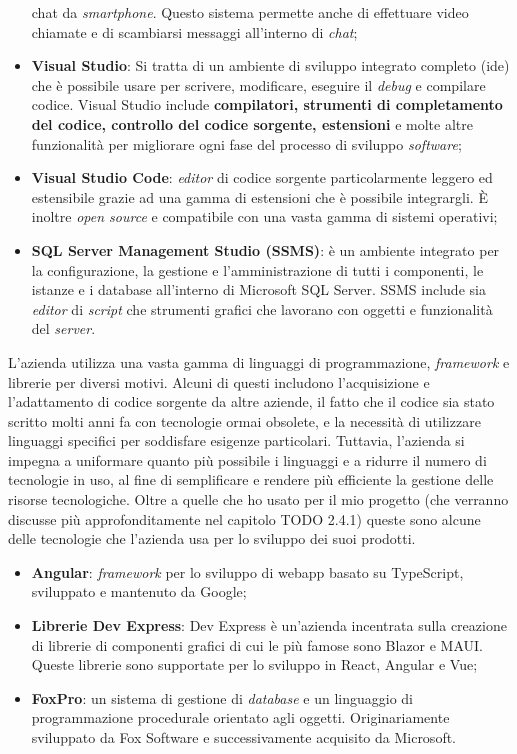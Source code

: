 \begin{itemize}
          chat da \textit{smartphone}. Questo sistema permette anche di effettuare video chiamate e di scambiarsi messaggi all'interno di \textit{chat};
    \item \textbf{Visual Studio}: Si tratta di un ambiente di sviluppo integrato completo (\gls{ide}) che è possibile usare per scrivere, modificare, 
          eseguire il \textit{debug} e compilare codice. Visual Studio include \textbf{compilatori, strumenti di completamento del codice, 
          controllo del codice sorgente, estensioni} e molte altre funzionalità per migliorare ogni fase del processo di sviluppo \textit{software};
    \item \textbf{Visual Studio Code}: \textit{editor} di codice sorgente particolarmente leggero ed estensibile grazie ad una gamma di estensioni 
          che è possibile integrargli. È inoltre \textit{open source} e compatibile con una vasta gamma di sistemi operativi;
    \item \textbf{SQL Server Management Studio (SSMS)}: è un ambiente integrato per la configurazione, la gestione e l'amministrazione di tutti i componenti, 
          le istanze e i database all'interno di Microsoft SQL Server. SSMS include sia \textit{editor} di \textit{script} che strumenti grafici che lavorano con 
          oggetti e funzionalità del \textit{server}.
\end{itemize}
L'azienda utilizza una vasta gamma di linguaggi di programmazione, \textit{framework} e librerie per diversi motivi. Alcuni di questi includono l'acquisizione 
e l'adattamento di codice sorgente da altre aziende, il fatto che il codice sia stato scritto molti anni fa con tecnologie ormai obsolete, e la necessità di utilizzare 
linguaggi specifici per soddisfare esigenze particolari. Tuttavia, l'azienda si impegna a uniformare quanto più possibile i linguaggi e a ridurre il numero di tecnologie in 
uso, al fine di semplificare e rendere più efficiente la gestione delle risorse tecnologiche. Oltre a quelle che ho usato per il mio progetto (che verranno discusse 
più approfonditamente nel capitolo TODO 2.4.1) queste sono alcune delle tecnologie che l'azienda usa per lo sviluppo dei suoi prodotti.
\begin{itemize}
    \item \textbf{Angular}: \textit{framework} per lo sviluppo di \gls{webapp} basato su TypeScript, sviluppato e mantenuto da Google;
    \item \textbf{Librerie Dev Express}: Dev Express è un'azienda incentrata sulla creazione di librerie di componenti grafici di cui le più famose sono 
          Blazor e MAUI. Queste librerie sono supportate per lo sviluppo in React, Angular e Vue;
    \item \textbf{FoxPro}: un sistema di gestione di \textit{database} e un linguaggio di programmazione procedurale orientato agli oggetti. Originariamente sviluppato 
          da Fox Software e successivamente acquisito da Microsoft. 
\end{itemize}
